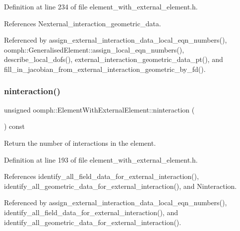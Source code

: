 Definition at line 234 of file element\+\_\+with\+\_\+external\+\_\+element.\+h.



References Nexternal\+\_\+interaction\+\_\+geometric\+\_\+data.



Referenced by assign\+\_\+external\+\_\+interaction\+\_\+data\+\_\+local\+\_\+eqn\+\_\+numbers(), oomph\+::\+Generalised\+Element\+::assign\+\_\+local\+\_\+eqn\+\_\+numbers(), describe\+\_\+local\+\_\+dofs(), external\+\_\+interaction\+\_\+geometric\+\_\+data\+\_\+pt(), and fill\+\_\+in\+\_\+jacobian\+\_\+from\+\_\+external\+\_\+interaction\+\_\+geometric\+\_\+by\+\_\+fd().

\mbox{\label{classoomph_1_1ElementWithExternalElement_ad63351d9c35ebe15e194a898a5daebc1}} 
\subsubsection{\texorpdfstring{ninteraction()}{ninteraction()}}
{\footnotesize\ttfamily unsigned oomph\+::\+Element\+With\+External\+Element\+::ninteraction (\begin{DoxyParamCaption}{ }\end{DoxyParamCaption}) const\hspace{0.3cm}{\ttfamily [inline]}}



Return the number of interactions in the element. 



Definition at line 193 of file element\+\_\+with\+\_\+external\+\_\+element.\+h.



References identify\+\_\+all\+\_\+field\+\_\+data\+\_\+for\+\_\+external\+\_\+interaction(), identify\+\_\+all\+\_\+geometric\+\_\+data\+\_\+for\+\_\+external\+\_\+interaction(), and Ninteraction.



Referenced by assign\+\_\+external\+\_\+interaction\+\_\+data\+\_\+local\+\_\+eqn\+\_\+numbers(), identify\+\_\+all\+\_\+field\+\_\+data\+\_\+for\+\_\+external\+\_\+interaction(), and identify\+\_\+all\+\_\+geometric\+\_\+data\+\_\+for\+\_\+external\+\_\+interaction().

